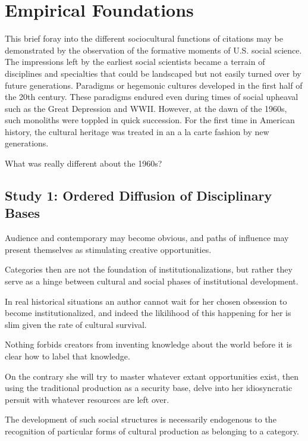 \section{Empirical Foundations}\label{empirical-foundations}

This brief foray into the different sociocultural functions of citations
may be demonstrated by the observation of the formative moments of U.S.
social science. The impressions left by the earliest social scientists
became a terrain of disciplines and specialties that could be landscaped
but not easily turned over by future generations. Paradigms or hegemonic
cultures developed in the first half of the 20th century. These
paradigms endured even during times of social upheaval such as the Great
Depression and WWII. However, at the dawn of the 1960s, such monoliths
were toppled in quick succession. For the first time in American
history, the cultural heritage was treated in an a la carte fashion by
new generations.

What was really different about the 1960s?

\subsection{Study 1: Ordered Diffusion of Disciplinary
Bases}\label{study-1-ordered-diffusion-of-disciplinary-bases}

Audience and contemporary may become obvious, and paths of influence may
present themselves as stimulating creative opportunities.

Categories then are not the foundation of institutionalizations, but
rather they serve as a hinge between cultural and social phases of
institutional development.

In real historical situations an author cannot wait for her chosen
obsession to become institutionalized, and indeed the likilihood of this
happening for her is slim given the rate of cultural survival.

Nothing forbids creators from inventing knowledge about the world before
it is clear how to label that knowledge.

On the contrary she will try to master whatever extant opportunities
exist, then using the traditional production as a security base, delve
into her idiosyncratic persuit with whatever resources are left over.

The development of such social structures is necessarily endogenous to
the recognition of particular forms of cultural production as belonging
to a category.

